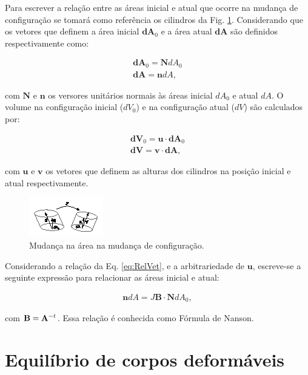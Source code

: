 \documentclass[tese_patricia]{subfiles}
\begin{document}
Para escrever a relação entre as áreas inicial e atual que ocorre na mudança de configuração se tomará como referência os cilindros da Fig. \ref{fig:DefArea}. Considerando que os vetores que definem a área inicial $\mathbf{dA}_{0} $ e a área atual $\mathbf{dA}$ são definidos respectivamente como:

\begin{align}
\mathbf{dA}_{0} = \mathbf{N}dA_{0}\\
\mathbf{dA} = \mathbf{n}dA \label{eq:areas},
\end{align}

\noindent com $\mathbf{N}$ e $\mathbf{n}$ os versores unitários normais às áreas inicial $dA_{0}$ e atual $dA$. O volume na configuração inicial ($dV_{0}$) e na configuração atual ($dV$) são calculados por:

\begin{align}
\mathbf{dV}_{0} = \mathbf{u} \cdot \mathbf{dA}_{0}\\
\mathbf{dV} = \mathbf{v} \cdot \mathbf{dA} \label{eq:vol},
\end{align}

\noindent com $\mathbf{u}$ e $\mathbf{v}$ os vetores que definem as alturas dos cilindros na posição inicial e atual respectivamente.

\begin{figure}[htb!]
	\centering
	\includegraphics[scale=6.0,trim=0cm 0.2cm 0cm 0cm, clip=true]{Imagens/Cap3/DefArea.eps}	
	\caption{Mudança na área na mudança de configuração.}
	\label{fig:DefArea}
\end{figure}

Considerando a relação da Eq. \eqref{eq:RelVet}, e a arbitrariedade de $\mathbf{u}$, escreve-se a seguinte expressão para relacionar as áreas inicial e atual:

\begin{align}
\mathbf{n}dA = J \mathbf{B} \cdot \mathbf{N} dA_{0}, \label{eq:Nanson}
\end{align}

\noindent com $\mathbf{B} = \mathbf{A}^{-t}$. Essa relação é conhecida como Fórmula de Nanson.

\section{Equilíbrio de corpos deformáveis} \label{sec:Equilibrio}
\end{document}
